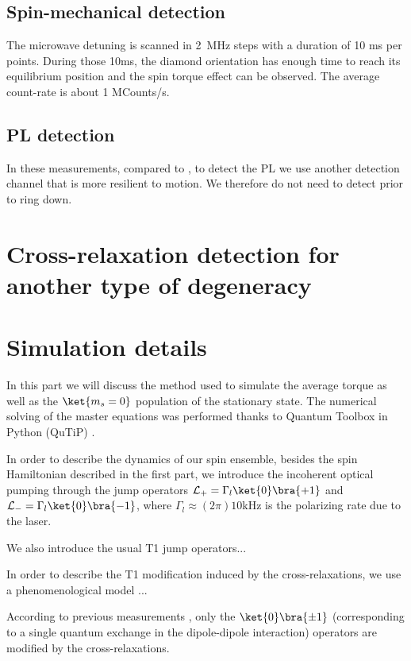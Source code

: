 \documentclass[preprintnumbers,amsmath,amssymb,onecolumn,12pt]{revtex4}
\begin{document}
\subsection{Spin-mechanical detection}

The microwave detuning is scanned in 2~MHz steps with a duration of 10 ms per points. During those 10ms, the diamond orientation has enough time to reach its equilibrium position and the spin torque effect can be observed. The average count-rate is about 1 MCounts/s.

\subsection{PL detection}

In these measurements, compared to \cite{DelordNat}, to detect the PL we use another detection channel that is more resilient to motion. We therefore do not need to detect prior to ring down.

\section*{Cross-relaxation detection for another type of degeneracy}

\section*{Simulation details}
In this part we will discuss the method used to simulate the average torque as well as the $\ket{m_s=0}$ population of the stationary state. The numerical solving of the master equations was performed thanks to Quantum Toolbox in Python (QuTiP) \citep{qutip1} \citep{qutip2}.

In order to describe the dynamics of our spin ensemble, besides the spin Hamiltonian described in the first part, we introduce the incoherent optical pumping through the jump operators $\mathcal{L}_+ = \Gamma_l \ket{0}\bra{+1} $ and $\mathcal{L}_- = \Gamma_l \ket{0}\bra{-1} $, where $\Gamma_l \approx (2\pi) 10$kHz is the polarizing rate due to the laser.

We also introduce the usual T1 jump operators...

In order to describe the T1 modification induced by the cross-relaxations, we use a phenomenological model ...

According to previous measurements \citep{choi_depolarization_2017}, only the $\ket{0}\bra{\pm1}$ (corresponding to a single quantum exchange in the dipole-dipole interaction) operators are modified by the cross-relaxations.


\end{document}
